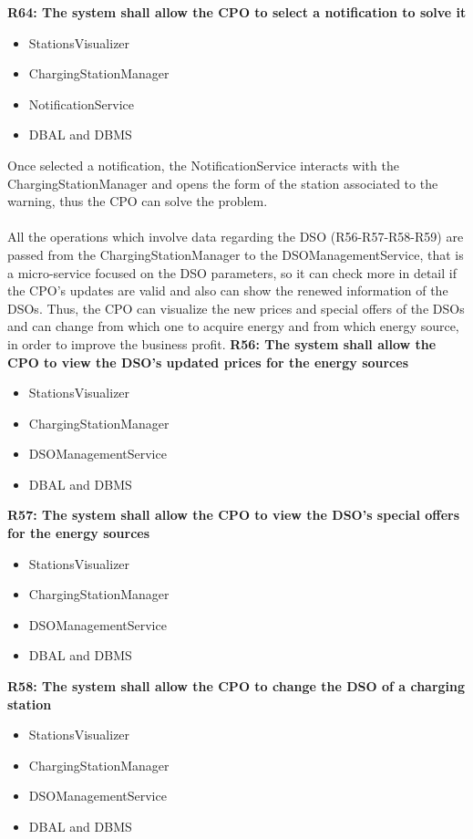 \textbf{R64: The system shall allow the CPO to select a notification to solve it }
\begin{itemize}
    \item StationsVisualizer
    \item ChargingStationManager
    \item NotificationService
    \item DBAL and DBMS
\end{itemize}
Once selected a notification, the NotificationService interacts with the ChargingStationManager and opens the form of the station associated to the warning, thus the CPO can solve the problem.\\
\\
All the operations which involve data regarding the DSO (R56-R57-R58-R59) are passed from the ChargingStationManager to the DSOManagementService, that is a micro-service focused on the DSO parameters, so it can check more in detail if the CPO's updates are valid and also can show the renewed information of the DSOs. Thus, the CPO can visualize the new prices and special offers of the DSOs and can change from which one to acquire energy and from which energy source, in order to improve the business profit.
\textbf{R56: The system shall allow the CPO to view the DSO's updated prices for the energy sources}
\begin{itemize}
    \item StationsVisualizer
    \item ChargingStationManager
    \item DSOManagementService
    \item DBAL and DBMS
\end{itemize}

\textbf{R57: The system shall allow the CPO to view the DSO's special offers for the energy sources}
\begin{itemize}
    \item StationsVisualizer
    \item ChargingStationManager
    \item DSOManagementService
    \item DBAL and DBMS
\end{itemize}

\textbf{R58: The system shall allow the CPO to change the DSO of a charging station}
\begin{itemize}
    \item StationsVisualizer
    \item ChargingStationManager
    \item DSOManagementService
    \item DBAL and DBMS
\end{itemize}

